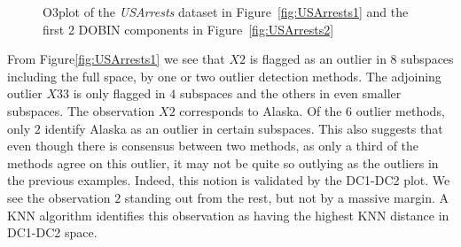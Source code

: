 \documentclass[11pt]{article}
\begin{document}
\begin{figure}
	\centering
	\caption{O3plot of the \textit{USArrests} dataset in Figure~\ref{fig:USArrests1} and the first 2 DOBIN components in Figure~\ref{fig:USArrests2} }
	\label{fig:USArrests}
\end{figure}

From Figure\ref{fig:USArrests1} we see that $X2$ is flagged as an outlier in $8$ subspaces including the full space, by one or two outlier detection methods. The adjoining outlier $X33$  is only flagged in $4$ subspaces and the others in even smaller subspaces.  The observation $X2$ corresponds to Alaska. Of the $6$ outlier methods, only $2$ identify Alaska as an outlier in certain subspaces. This also suggests that even though there is consensus between two methods, as only a third of the methods agree on this outlier, it may not be quite so outlying as the outliers in the previous examples. Indeed, this notion is validated by the DC1-DC2 plot. We see the observation $2$ standing out from the rest, but not by a massive margin. A KNN algorithm identifies this observation as having the highest KNN distance in DC1-DC2 space.   \\   
\end{document}
